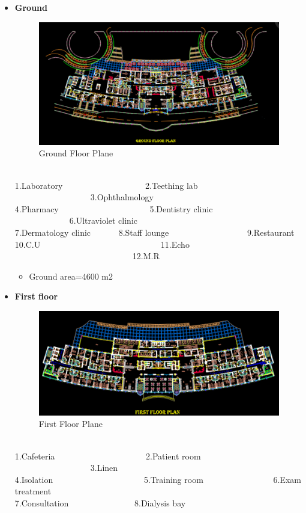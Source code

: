 \documentclass[12pt,fleqn]{book} %
\begin{document}
\begin{itemize}
	    
	    \item \textbf{Ground}
	    \begin{figure}[h!]
    \centering
    \includegraphics[width=0.6\linewidth]{i 2.png}
    \caption{ Ground Floor Plane}
    \label{fig:i 2}
\end{figure}
\\1.Laboratory \ \ \ \ \ \  \ \ \ \ \ \ \ \ \ \  \ \ \ 2.Teething lab \ \ \ \ \ \ \ \ \ \  \ \ \ \ \ \ \ \ 3.Ophthalmology
\\4.Pharmacy \ \ \ \ \ \  \ \ \ \ \ \ \ \ \ \  \ \ \ \ \  5.Dentistry clinic \ \ \ \ \ \ \ \ \ \ \ \ \ 6.Ultraviolet clinic
\\ 7.Dermatology clinic \ \ \ \ \ \ 8.Staff lounge \ \ \ \ \ \ \ \ \ \ \ \ \ \ \ \ \ \  9.Restaurant
\\ 10.C.U \ \ \ \ \ \ \ \  \ \ \ \ \ \ \ \ \ \  \ \ \ \ \ \ \ \ \ \ 11.Echo \ \ \ \ \ \ \ \ \ \ \ \ \ \ \  \ \ \ \ \ \ \ \ \ \ \ \ \ 12.M.R
\begin{itemize}
    \item Ground area=4600 m2
\end{itemize}


\newpage
	    
	    \item \textbf{First floor}
	        \begin{figure}[h!]
    \centering
    \includegraphics[width=0.8\linewidth]{i 3.png}
    \caption{ First Floor Plane}
    \label{fig:i 3}
\end{figure}
\\1.Cafeteria \ \ \ \ \ \ \ \ \ \ \ \ \ \ \ \ \ \ \ \ \  2.Patient room  \ \ \ \ \ \ \ \ \ \ \ \ \ \ \ \ \ \ 3.Linen
\\4.Isolation \ \ \ \ \ \ \ \ \ \ \ \ \ \ \ \ \ \ \ \ \  5.Training room  \ \ \ \ \ \ \ \ \ \ \ \ \ \ \ \  6.Exam treatment
\\7.Consultation \ \ \ \ \ \ \ \ \ \ \ \ \ \ \  8.Dialysis bay


\end{itemize}
\end{document}
